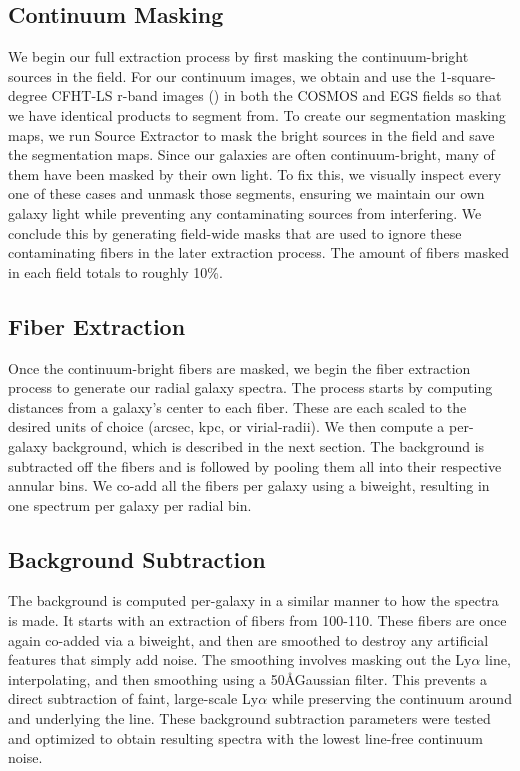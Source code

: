 \documentclass[linenumbers,amsmath,trackchanges,preprint2]{aastex702}
\begin{document}
\subsection{Continuum Masking}
\par We begin our full extraction process by first masking the continuum-bright sources in the field. For our continuum images, we obtain and use the 1-square-degree CFHT-LS r-band images (\cite{?}) in both the COSMOS and EGS fields so that we have identical products to segment from. To create our segmentation masking maps, we run Source Extractor to mask the bright sources in the field and save the segmentation maps. Since our galaxies are often continuum-bright, many of them have been masked by their own light. To fix this, we visually inspect every one of these cases and unmask those segments, ensuring we maintain our own galaxy light while preventing any contaminating sources from interfering. We conclude this by generating field-wide masks that are used to ignore these contaminating fibers in the later extraction process. The amount of fibers masked in each field totals to roughly 10\%. 

\subsection{Fiber Extraction}
\par Once the continuum-bright fibers are masked, we begin the fiber extraction process to generate our radial galaxy spectra. The process starts by computing distances from a galaxy's center to each fiber. These are each scaled to the desired units of choice (arcsec, kpc, or virial-radii). We then compute a per-galaxy background, which is described in the next section. The background is subtracted off the fibers and is followed by pooling them all into their respective annular bins. We co-add all the fibers per galaxy using a biweight, resulting in one spectrum per galaxy per radial bin.

\subsection{Background Subtraction}
\par The background is computed per-galaxy in a similar manner to how the spectra is made. It starts with an extraction of fibers from 100-110\arcsec. These fibers are once again co-added via a biweight, and then are smoothed to destroy any artificial features that simply add noise. The smoothing involves masking out the Ly$\alpha$ line, interpolating, and then smoothing using a 50\AA Gaussian filter. This prevents a direct subtraction of faint, large-scale Ly$\alpha$ while preserving the continuum around and underlying the line. These background subtraction parameters were tested and optimized to obtain  resulting spectra with the lowest line-free continuum noise.
\end{document}
